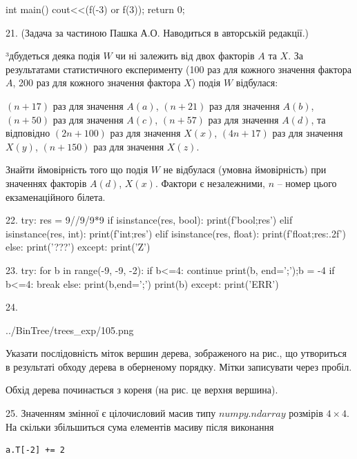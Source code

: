 \documentclass[11pt]{article}
\begin{document}
int main(){
    cout<<(f(-3) or f(3));
    return 0;
}

21. 
(Задача за частиною Пашка А.О. Наводиться в авторській редакції.)\par {\hspace {0.5 cm}}³дбудеться деяка подія $W$ чи ні залежить від двох факторів $A$ та $X$. За результатами статистичного експерименту (100 раз для кожного значення фактора $A$,  200 раз для кожного значення фактора $X$) подія $W$ відбулася:\par {\hspace {0.5 cm}}$(n+17)$ раз для значення $A(a)$, $(n+21)$ раз для значення $A(b)$, $(n+50)$ раз для значення $A(c)$, $(n+57)$ раз для значення $A(d)$, та відповідно $(2n+100)$ раз для значення $X(x)$, $(4n+17)$ раз для значення $X(y)$, $(n+150)$ раз для значення $X(z)$.\par
{\hspace {0.5 cm}}Знайти ймовірність того що подія $W$ не відбулася (умовна ймовірність) при значеннях факторів $A(d)$, $X(x)$. Фактори є незалежними, $n$ – номер цього екзаменаційного білета.\par
22. 
try:
    res = 9//9/9*9
    if isinstance(res, bool):
        print(f'bool;{res}')
    elif isinstance(res, int):
        print(f'int;{res}')
    elif isinstance(res, float):
        print(f'float;{res:.2f}')
    else:
        print('???')
except:
    print('Z')

23. 
try:
    for b in range(-9, -9, -2):
        if b<=4:
            continue
        print(b, end=';');b = -4
        if b<=4:
            break
    else:
        print(b,end=';')
    print(b)
except:
    print('ERR')

24. 

\begin{center}
	{../BinTree/trees_exp/105.png}
\end{center}
Указати послідовність міток вершин дерева, зображеного на рис., що утвориться в результаті обходу дерева в оберненому порядку. Мітки записувати через пробіл.\par Обхід дерева починається з кореня (на рис. це верхня вершина).

25. 
Значенням змінної  є цілочисловий масив типу $numpy.ndarray$ розмірів $4{\times}4$. На скільки збільшиться сума елементів масиву  після виконання
\begin{verbatim}
a.T[-2] += 2
\end{verbatim}
\end{document}
